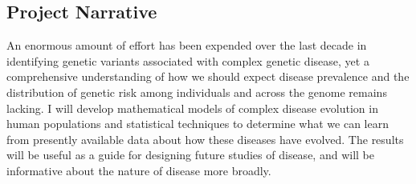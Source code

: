 \documentclass[11pt]{article}
\begin{document}
\subsection*{Project Narrative}

An enormous amount of effort has been expended over the last decade in identifying genetic variants associated with complex genetic disease, yet a comprehensive understanding of how we should expect disease prevalence and the distribution of genetic risk among individuals and across the genome remains lacking. I will develop mathematical models of complex disease evolution in human populations and statistical techniques to determine what we can learn from presently available data about how these diseases have evolved. The results will be useful as a guide for designing future studies of disease, and will be informative about the nature of disease more broadly.
\end{document}
